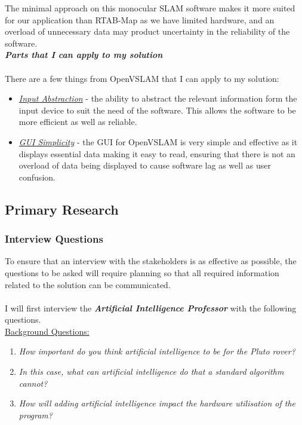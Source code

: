\documentclass[11pt]{report}
\begin{document}
\begin{itemize}
			The minimal approach on this monocular SLAM software makes it more suited for our application than RTAB-Map as we have limited hardware, and an overload of unnecessary data may product uncertainty in the reliability of the software. \\
			\newpage
			\emph{\textbf{Parts that I can apply to my solution}}
			\\\\There are a few things from OpenVSLAM that I can apply to my solution:
				\begin{itemize}
					\item{\underline{\emph{Input Abstraction}}} - the ability to abstract the relevant information form the 		input device to suit the need of the software. This allows the software to be more efficient as well as 		reliable.
					\item{\underline{\emph{GUI Simplicity}}} - the GUI for OpenVSLAM is very simple and effective as it 		displays essential data making it easy to read, ensuring that there is not an overload of data being 			displayed to cause software lag as well as user confusion. 
				\end{itemize}
	
		\end{itemize}
		\newpage

	\subsection{Primary Research}
		\subsubsection{Interview Questions}

			To ensure that an interview with the stakeholders is as effective as possible, the questions to be asked will require planning so that all required information related to the solution can be communicated. \\\\
			I will first interview the \textbf{\emph{Artificial Intelligence Professor}} with the following questions.\\

			\underline{Background Questions:}
				\begin{enumerate}
					\item{\emph{How important do you think artificial intelligence to be for the Pluto rover?}}
					\item{\emph{In this case, what can artificial intelligence do that a standard algorithm cannot?}}
					\item{\emph{How will adding artificial intelligence impact the hardware utilisation of the program?}}
				\end{enumerate}
\end{document}

